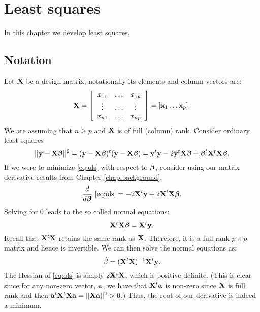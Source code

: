 \chapter{Least squares}

In this chapter we develop least squares. 

\section{Notation}
Let $\mathbf{X}$ be a design matrix, notationally its
elements and column vectors are:
$$
\mathbf{X} =
\left[
\begin{array}{ccc}
x_{11} & \ldots & x_{1p}  \\
\vdots & \ldots & \vdots \\
x_{n1} & \ldots & x_{np}
\end{array}
\right]
= [\mathbf{x}_1 \ldots \mathbf{x}_p].
$$
We are assuming that $n \geq p$ and $\mathbf{X}$ is of full (column) rank. 
Consider ordinary least squares
\begin{equation}
\label{eq:ols}
|| \mathbf{y} - \mathbf{X} \boldsymbol{\beta} ||^2 = (\mathbf{y} - \mathbf{X} \boldsymbol{\beta})^t (\mathbf{y} - \mathbf{X} \boldsymbol{\beta})
= \mathbf{y}^t \mathbf{y} - 2 \mathbf{y}^t \mathbf{X} \boldsymbol{\beta} + \boldsymbol{\beta}^t \mathbf{X}^t \mathbf{X} \boldsymbol{\beta}.
\end{equation}
If we were to minimize \eqref{eq:ols} with respect to $\boldsymbol{\beta}$,
consider using our matrix derivative results from Chapter \ref{chap:background}.
$$
\frac{d}{d\boldsymbol{\beta}}~\eqref{eq:ols}
= -2 \mathbf{X}^t \mathbf{y} + 2 \mathbf{X}^t \mathbf{X} \boldsymbol{\beta}.
$$
Solving for $0$ leads to the so called normal equations:
$$\mathbf{X}^t \mathbf{X} \boldsymbol{\beta} = \mathbf{X}^t \mathbf{y}.$$
Recall that $\mathbf{X}^t \mathbf{X}$ retains the same rank as $\mathbf{X}$. Therefore,
it is a full rank $p\times p$ matrix and hence is invertible. We
can then solve the normal equations as:
\begin{equation}
\label{eq:betahat}
\hat \beta = (\mathbf{X}^t \mathbf{X})^{-1} \mathbf{X}^t \mathbf{y}.
\end{equation}
The Hessian of \eqref{eq:ols} is simply $2\mathbf{X}^t \mathbf{X}$, which is positive
definite. (This is clear since for any non-zero vector, $\mathbf{a}$, we have that
$\mathbf{X}^t \mathbf{a}$ is non-zero since $\mathbf{X}$ is full rank and then
$\mathbf{a}^t \mathbf{X}^t \mathbf{X} \mathbf{a} = ||\mathbf{X} \mathbf{a}||^2 > 0$.) Thus, the root of
our derivative is indeed a minimum. 


